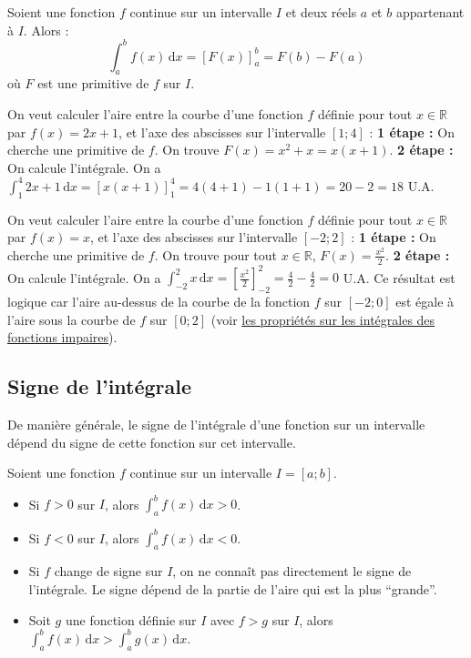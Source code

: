 	\begin{formula}
		Soient une fonction $f$ continue sur un intervalle $I$ et deux réels $a$ et $b$ appartenant à $I$. Alors :
		\[ \int_{a}^{b} f(x) \, \mathrm{d}x = \left[ F(x) \right]_a^b = F(b) - F(a) \]
		où $F$ est une primitive de $f$ sur $I$.
	\end{formula}
	
	\begin{tip}[Exemple]
		On veut calculer l'aire entre la courbe d'une fonction $f$ définie pour tout $x \in \mathbb{R}$ par $f(x) = 2x + 1$, et l'axe des abscisses sur l'intervalle $[1;4]$ :
		\newpar
		\textbf{1\iere{} étape :} On cherche une primitive de $f$. On trouve $F(x) = x^2 + x = x(x + 1)$.
		\newpar
		\textbf{2\ieme{} étape :} On calcule l'intégrale.
		On a $\int_{1}^{4} 2x + 1 \, \mathrm{d}x = \left[ x(x + 1) \right]_1^4 = 4(4 + 1) - 1(1 + 1) = 20 - 2 = 18$ U.A.
	\end{tip}
	
	\begin{tip}
		On veut calculer l'aire entre la courbe d'une fonction $f$ définie pour tout $x \in \mathbb{R}$ par $f(x) = x$, et l'axe des abscisses sur l'intervalle $[-2;2]$ :
		\newpar
		\textbf{1\iere{} étape :} On cherche une primitive de $f$. On trouve pour tout $x \in \mathbb{R}$, $F(x) = \frac{x^2}{2}$.
		\newpar
		\textbf{2\ieme{} étape :} On calcule l'intégrale. On a $\int_{-2}^{2} x \, \mathrm{d}x = \left[ \frac{x^2}{2} \right]_{-2}^2 = \frac{4}{2} - \frac{4}{2} = 0$ U.A.
		\newpar
		Ce résultat est logique car l'aire au-dessus de la courbe de la fonction $f$ sur $[-2;0]$ est égale à l'aire sous la courbe de $f$ sur $[0;2]$ (voir \hyperref[integrales-paires-impaires]{les propriétés sur les intégrales des fonctions impaires}).
	\end{tip}
	
	\subsection{Signe de l'intégrale}
	
	De manière générale, le signe de l'intégrale d'une fonction sur un intervalle dépend du signe de cette fonction sur cet intervalle.
	
	\begin{formula}
		Soient une fonction $f$ continue sur un intervalle $I = [a; b]$.
		\begin{itemize}
			\item Si $f > 0$ sur $I$, alors $\int_{a}^{b} f(x) \, \mathrm{d}x > 0$.
			\item Si $f < 0$ sur $I$, alors $\int_{a}^{b} f(x) \, \mathrm{d}x < 0$.
			\item Si $f$ change de signe sur $I$, on ne connaît pas directement le signe de l'intégrale. Le signe dépend de la partie de l'aire qui est la plus ``grande''.
			\item Soit $g$ une fonction définie sur $I$ avec $f > g$ sur $I$, alors $\int_{a}^{b} f(x) \, \mathrm{d}x > \int_{a}^{b} g(x) \, \mathrm{d}x$.
		\end{itemize}
	\end{formula}
	
